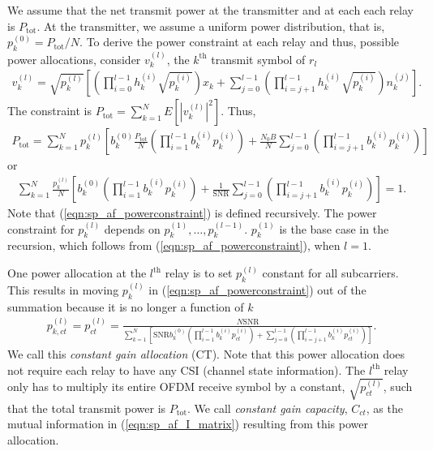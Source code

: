 We assume that the net transmit power at the transmitter and at each each relay is $P_{\mbox{tot}}$.  At the transmitter, we assume a uniform power distribution, that is, $p_k^{(0)} = P_{\mbox{tot}}/N$.  To derive the power constraint at each relay and thus, possible power allocations, consider $v_k^{(l)}$, the $k^{\mbox{th}}$ transmit symbol of $r_l$
\begin{eqnarray}
v_k^{(l)} = \sqrt{p_k^{(l)}} \left[ \left( \prod_{i=0}^{l-1} h_k^{(i)}  \sqrt{p_k^{(i)}} \right)  x_k + \sum_{j=0}^{l-1}\left( \prod_{i=j+1}^{l-1} h_k^{(i)}  \sqrt{p_k^{(i)}} \right)n_k^{(j)} \right] \mbox{.}
\end{eqnarray}
The constraint is $P_{\mbox{tot}} = \displaystyle \sum_{k=1}^{N} E \left[ \left| v_k^{(l)} \right|^2 \right]$.  Thus,
\begin{eqnarray}
P_{\mbox{tot}} = \displaystyle \sum_{k=1}^{N} p_k^{(l)}
\left[ b_k^{(0)} \frac{P_{\mbox{tot}}}{N}  \left( \displaystyle \prod_{i=1}^{l-1}  b_k^{(i)} p_k^{(i)} \right) + 
\frac{N_0 B}{N} \sum_{j=0}^{l-1} \left( \displaystyle \prod_{i=j+1}^{l-1}  b_k^{(i)} p_k^{(i)} \right) 
\right]
\label{eqn:sp_af_powerconstraint0}
\end{eqnarray}
or
\begin{eqnarray}
\sum_{k=1}^N \frac{ p_k^{(l)}}{N} \left[
b_k^{(0)} \left( \prod_{i=1}^{l-1}  b_k^{(i)}p_k^{(i)} \right) + 
\frac{1}{\mbox{SNR}} \sum_{j=0}^{l-1} \left( \prod_{i=j+1}^{l-1}  b_k^{(i)}p_k^{(i)}
\right)
\right] =1.
\label{eqn:sp_af_powerconstraint}
\end{eqnarray}
Note that (\ref{eqn:sp_af_powerconstraint}) is defined recursively.  The power constraint for $p_k^{(l)}$ depends on $p_k^{(1)}, \dots, p_k^{(l-1)}$.  $p_k^{(1)}$ is the base case in the recursion, which follows from (\ref{eqn:sp_af_powerconstraint}), when $l = 1$.

One power allocation at the $l^{\mbox{th}}$ relay is to set $p_k^{(l)}$ constant for all subcarriers.  This results in moving $p_k^{(l)}$ in (\ref{eqn:sp_af_powerconstraint}) out of the summation because it is no longer a function of $k$
\begin{eqnarray}
p_{k,ct}^{(l)} = p_{ct}^{(l)} = 
 \frac{N \mbox{SNR}}
{\displaystyle \sum_{k=1}^N \left[ \mbox{SNR} b_k^{(0)} \left( \displaystyle \prod_{i=1}^{l-1} b_k^{(i)} p_{ct}^{(i)}\right) + \displaystyle \sum_{j=0}^{l-1} \left( \displaystyle \prod_{i=j+1}^{l-1} b_k^{(i)} p_{ct}^{(i)}\right)
\right]
} \mbox{.}
\end{eqnarray}
We call this \emph{constant gain allocation} (CT).  Note that this power allocation does not require each relay to have any CSI (channel state information).  The $l^{\mbox{th}}$ relay only has to multiply its entire OFDM receive symbol by a constant, $\sqrt{p_{ct}^{(l)}}$, such that the total transmit power is $P_{\mbox{tot}}$.  We call \emph{constant gain capacity}, $C_{ct}$, as the mutual information in (\ref{eqn:sp_af_I_matrix}) resulting from this power allocation.

